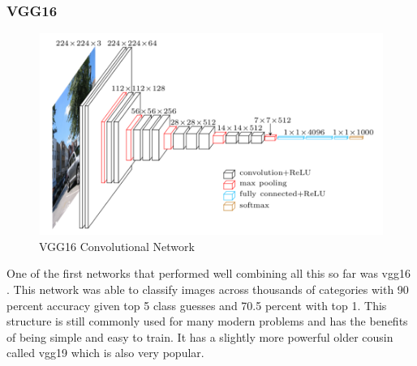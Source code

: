 \subsubsection{VGG16}
\begin{figure}[H]
	\centering
	\includegraphics[scale=0.5]{images/vgg16}
	\caption{VGG16 Convolutional Network}
	\label{f:vgg16}
\end{figure}

One of the first networks that performed well combining all this so far was vgg16 \cite{pateria1990enhanced}. This network was able to classify images across thousands of categories with 90 percent accuracy given top 5 class guesses and 70.5 percent with top 1. This structure is still commonly used for many modern problems and has the benefits of being simple and easy to train. It has a slightly more powerful older cousin called vgg19 which is also very popular.
